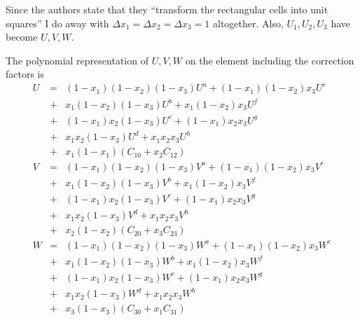 Since the authors state that they ``transform the rectangular cells into unit squares'' 
I do away with $\Delta x_1 = \Delta x_2 = \Delta x_3 =1$ altogether. 
Also, $U_1,U_2,U_3$ have become $U,V,W$.

The polynomial representation of $U,V,W$ on the element including the correction factors is
\begin{eqnarray}
U 
&=&(1-x_1)(1-x_2)(1-x_3) U^a 
+(1-x_1)(1-x_2)x_3 U^e \nonumber\\
&+&x_1(1-x_2)(1-x_3) U^b 
+x_1(1-x_2)x_3 U^f \nonumber\\
&+&(1-x_1)x_2(1-x_3) U^c 
+(1-x_1)x_2 x_3 U^g \nonumber\\
&+&x_1 x_2(1-x_3) U^d 
+ x_1 x_2 x_3 U^h \nonumber\\
&+& x_1(1-x_1)(C_{10}+x_2 C_{12})\\
V 
&=&(1-x_1)(1-x_2)(1-x_3) V^a 
+(1-x_1)(1-x_2)x_3 V^e \nonumber\\
&+&x_1(1-x_2)(1-x_3) V^b
+x_1(1-x_2)x_3 V^f \nonumber\\
&+&(1-x_1)x_2(1-x_3) V^c 
+(1-x_1)x_2 x_3 V^g \nonumber\\
&+&x_1 x_2(1-x_3) V^d 
+x_1 x_2 x_3 V^h \nonumber\\
&+& x_2(1-x_2)(C_{20}+x_3 C_{23})\\
W 
&=&(1-x_1)(1-x_2)(1-x_3) W^a 
+(1-x_1)(1-x_2)x_3 W^e \nonumber\\
&+&x_1(1-x_2)(1-x_3) W^b
+x_1(1-x_2)x_3 W^f \nonumber\\
&+&(1-x_1)x_2(1-x_3) W^c 
+(1-x_1)x_2 x_3 W^g \nonumber\\
&+&x_1 x_2(1-x_3) W^d 
+ x_1 x_2 x_3 W^h \nonumber\\
&+& x_3(1-x_3)(C_{30}+x_1 C_{31})
\end{eqnarray}


